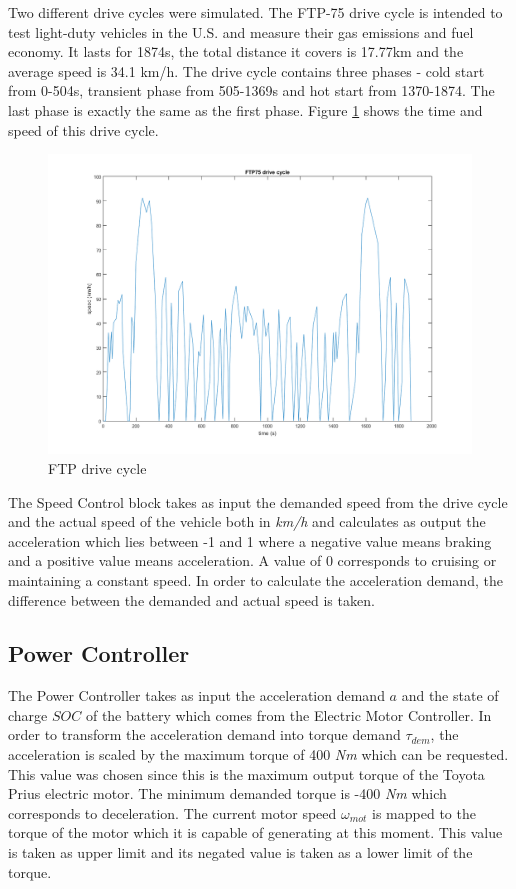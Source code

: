 Two different drive cycles were simulated. The FTP-75 drive cycle is intended to test light-duty vehicles in the U.S. and measure their gas emissions and fuel economy. It lasts for 1874s, the total distance it covers is 17.77km and the average speed is 34.1 km/h. The drive cycle contains three phases - cold start from 0-504s, transient phase from 505-1369s and hot start from 1370-1874. The last phase is exactly the same as the first phase. Figure \ref{fig:ftp75} shows the time and speed of this drive 
cycle.

\begin{figure}[h]
\centering
\includegraphics[scale=0.45]{figures/FTP75}
\caption{FTP drive cycle}
\label{fig:ftp75}
\end{figure}


The Speed Control block takes as input the demanded speed from the drive cycle and the actual speed of the vehicle both in \textit{km/h} and calculates as output the acceleration which lies between -1 and 1 where a negative value means braking and a positive value means acceleration. A value of 0 corresponds to cruising or maintaining a constant speed. In order to calculate the acceleration demand, the difference between the demanded and actual speed is taken.

\subsection{Power Controller}
\label{subsec:powerContr}
The Power Controller takes as input the acceleration demand $a$ and the state of charge $SOC$ of the battery which comes from the Electric Motor Controller. In order to transform the acceleration demand into torque demand $\tau_{dem}$, the acceleration is scaled by the maximum torque of 400 \textit{Nm} which can be requested. This value was chosen since this is the maximum output torque of the Toyota Prius electric motor. The minimum demanded torque is -400 \textit{Nm} which corresponds to deceleration. The current motor speed $\omega_{mot}$ is mapped to the torque of the motor which it is capable of generating at this moment. This value is taken as upper limit and its negated value is taken as a lower limit of the torque. 

